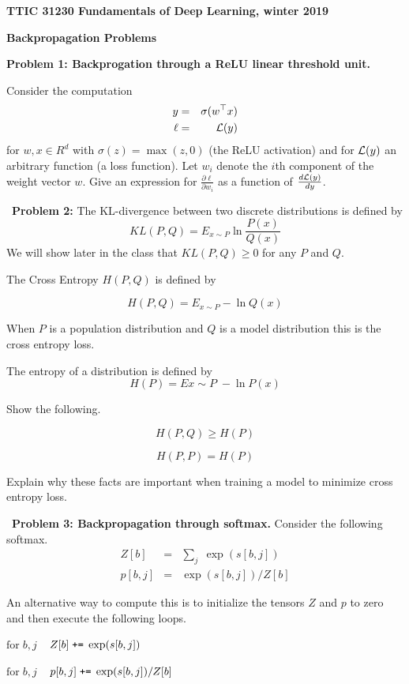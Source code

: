 \documentclass{article}
\begin{document}
\centerline{\bf TTIC 31230 Fundamentals of Deep Learning, winter 2019}
\medskip
\centerline{\bf Backpropagation  Problems}

\bigskip

{\bf Problem 1: Backprogation through a ReLU linear threshold unit.}

Consider the computation
\begin{eqnarray*}
  y & = & \sigma(w^\top x) \\
  \ell & = & {\cal L}(y)
\end{eqnarray*}
for $w,x \in R^d$ with $\sigma(z) = \max(z,0)$ (the ReLU activation)
and for ${\cal L}(y)$ an arbitrary function (a loss function).  Let $w_i$ denote the $i$th component of the weight vector $w$.
Give an expression for $\frac{\partial \ell}{\partial w_i}$ as a function of $\frac{d{\cal L}(y)}{dy}$.

\bigskip
~{\bf Problem 2:} The KL-divergence between two discrete distributions is defined by
$$KL(P,Q) = E_{x \sim P} \ln \frac{P(x)}{Q(x)}$$
We will show later in the class that $KL(P,Q) \geq 0$ for any $P$ and $Q$.

The Cross Entropy $H(P,Q)$ is defined by

$$H(P,Q) = E_{x \sim P} - \ln Q(x)$$

When $P$ is a population distribution and $Q$ is a model distribution this is the cross entropy loss.

The entropy of a distribution is defined by
$$H(P) = E{x \sim P}\;-\ln P(x)$$

Show the following.

$$H(P,Q) \geq H(P)$$

$$H(P,P) = H(P)$$

Explain why these facts are important when training a model to minimize cross entropy loss.

\bigskip
~{\bf Problem 3:  Backpropagation through softmax.} Consider the following softmax.
\begin{eqnarray*}
  Z[b] & = & \sum_j\;\exp(s[b,j]) \\
  p[b,j] & = & \exp(s[b,j])/Z[b]
\end{eqnarray*}

An alternative way to compute this is to initialize the tensors $Z$ and $p$ to zero and then execute the following loops.

\medskip
$\mathrm{for}\;b,j$
$\;\;\;Z[b]\;\mbox{\tt +=}\;\exp(s[b,j])$

\medskip
$\mathrm{for}\;b,j$
$\;\;\;p[b,j] \;\mbox{\tt +=}\; \exp(s[b,j])/Z[b]$
\end{document}
